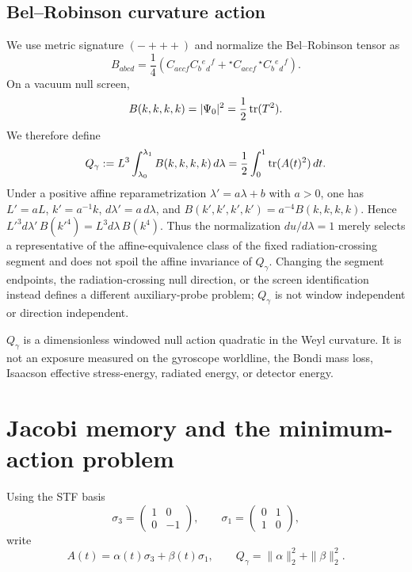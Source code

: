 \subsection{Bel--Robinson curvature action}
We use metric signature $(-+++)$ and normalize the Bel--Robinson tensor as
\begin{equation}
B_{abcd}=\frac14\left(C_{aecf}C_b{}^e{}_d{}^f+{}^\star C_{aecf}\,{}^\star C_b{}^e{}_d{}^f\right).
\label{eq:BR-def}
\end{equation}
On a vacuum null screen,
\begin{equation}
B(k,k,k,k)=|\Psi_0|^2=\frac12\operatorname{tr}(T^2).
\label{eq:BR-tidal}
\end{equation}
We therefore define
\begin{equation}
Q_\gamma:=L^3\int_{\lambda_0}^{\lambda_1}B(k,k,k,k)\,d\lambda
=\frac12\int_0^1\operatorname{tr}(A(t)^2)\,dt.
\label{eq:Q}
\end{equation}
Under a positive affine reparametrization $\lambda'=a\lambda+b$ with $a>0$, one has $L'=aL$, $k'=a^{-1}k$, $d\lambda'=a\,d\lambda$, and $B(k',k',k',k')=a^{-4}B(k,k,k,k)$. Hence $L'^3d\lambda'\,B(k'^4)=L^3d\lambda\,B(k^4)$. Thus the normalization $du/d\lambda=1$ merely selects a representative of the affine-equivalence class of the fixed radiation-crossing segment and does not spoil the affine invariance of $Q_\gamma$. Changing the segment endpoints, the radiation-crossing null direction, or the screen identification instead defines a different auxiliary-probe problem; $Q_\gamma$ is not window independent or direction independent.

\begin{remark}
$Q_\gamma$ is a dimensionless windowed null action quadratic in the Weyl curvature. It is not an exposure measured on the gyroscope worldline, the Bondi mass loss, Isaacson effective stress-energy, radiated energy, or detector energy.
\end{remark}

\section{Jacobi memory and the minimum-action problem}
Using the STF basis
\[
\sigma_3=\begin{pmatrix}1&0\\0&-1\end{pmatrix},\qquad
\sigma_1=\begin{pmatrix}0&1\\1&0\end{pmatrix},
\]
write
\begin{equation}
A(t)=\alpha(t)\sigma_3+\beta(t)\sigma_1,
\qquad Q_\gamma=\|\alpha\|_2^2+\|\beta\|_2^2.
\label{eq:control}
\end{equation}

